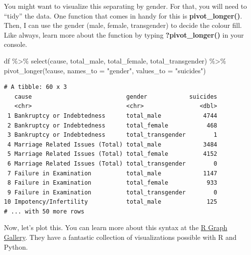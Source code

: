 \documentclass[
  letterpaper,
  DIV=11,
  numbers=noendperiod]{scrartcl}
\newenvironment{Shaded}{\begin{snugshade}}{\end{snugshade}}
\newcommand{\AttributeTok}[1]{\textcolor[rgb]{0.40,0.45,0.13}{#1}}
\newcommand{\FunctionTok}[1]{\textcolor[rgb]{0.28,0.35,0.67}{#1}}
\newcommand{\NormalTok}[1]{\textcolor[rgb]{0.00,0.23,0.31}{#1}}
\newcommand{\SpecialCharTok}[1]{\textcolor[rgb]{0.37,0.37,0.37}{#1}}
\newcommand{\StringTok}[1]{\textcolor[rgb]{0.13,0.47,0.30}{#1}}
\begin{document}
You might want to visualize this separating by gender. For that, you
will need to ``tidy'' the data. One function that comes in handy for
this is \textbf{pivot\_longer()}. Then, I can use the gender (male,
female, transgender) to decide the colour fill. Like always, learn more
about the function by typing \textbf{?pivot\_longer()} in your console.

\begin{Shaded}
\begin{Highlighting}[]
\NormalTok{df }\SpecialCharTok{\%\textgreater{}\%} 
   \FunctionTok{select}\NormalTok{(cause, total\_male, total\_female, total\_transgender) }\SpecialCharTok{\%\textgreater{}\%} 
   \FunctionTok{pivot\_longer}\NormalTok{(}\SpecialCharTok{!}\NormalTok{cause, }\AttributeTok{names\_to =} \StringTok{"gender"}\NormalTok{, }\AttributeTok{values\_to =} \StringTok{"suicides"}\NormalTok{)}
\end{Highlighting}
\end{Shaded}

\begin{verbatim}
# A tibble: 60 x 3
   cause                           gender            suicides
   <chr>                           <chr>                <dbl>
 1 Bankruptcy or Indebtedness      total_male            4744
 2 Bankruptcy or Indebtedness      total_female           468
 3 Bankruptcy or Indebtedness      total_transgender        1
 4 Marriage Related Issues (Total) total_male            3484
 5 Marriage Related Issues (Total) total_female          4152
 6 Marriage Related Issues (Total) total_transgender        0
 7 Failure in Examination          total_male            1147
 8 Failure in Examination          total_female           933
 9 Failure in Examination          total_transgender        0
10 Impotency/Infertility           total_male             125
# ... with 50 more rows
\end{verbatim}

Now, let's plot this. You can learn more about this syntax at the
\href{https://r-graph-gallery.com/48-grouped-barplot-with-ggplot2.html}{R
Graph Gallery}. They have a fantastic collection of visualizations
possible with R and Python.
\end{document}
